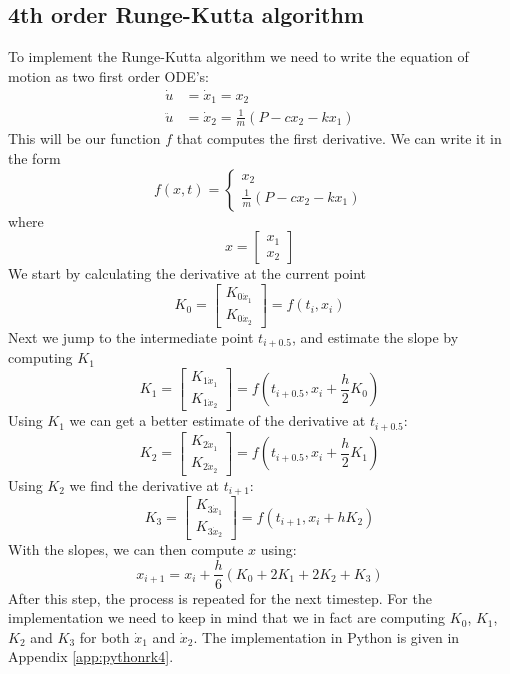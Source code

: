 \documentclass[11pt, a4paper, english, hidelinks]{NTNUoving}
\begin{document}
\subsection{4th order Runge-Kutta algorithm}
To implement the Runge-Kutta algorithm we need to write the equation of motion as two first order ODE's:
\begin{align}
	\label{eq:firstorderode}
	\dot{u} &= \dot{x}_1 = x_2 \\
	\ddot{u} &= \dot{x}_2 = \frac{1}{m}(P-cx_2-kx_1)
\end{align}
This will be our function $f$ that computes the first derivative. We can write it in the form
\begin{equation}
	f(x,t) = \begin{cases}
	x_2 \\
	\frac{1}{m}(P-cx_2-kx_1)
	\end{cases}
\end{equation}
where
$$
x = \begin{bmatrix}
x_1 \\ x_2
\end{bmatrix}
$$
We start by calculating the derivative at the current point
\begin{equation}
	\label{eq:k0}
	K_0 = \begin{bmatrix}
	K_{0\dot{x}_1} \\
	K_{0\dot{x}_2}
	\end{bmatrix} = f(t_i,x_i)
\end{equation}
Next we jump to the intermediate point $t_{i+0.5}$, and estimate the slope by computing $K_1$
\begin{equation}
	\label{eq:k1}
	K_1 = \begin{bmatrix}
	K_{1\dot{x}_1} \\
	K_{1\dot{x}_2}
	\end{bmatrix} = f(t_{i+0.5}, x_i + \frac{h}{2}K_0)
\end{equation}
Using $K_1$ we can get a better estimate of the derivative at $t_{i+0.5}$:
\begin{equation}
	\label{eq:k2}
	K_2 = \begin{bmatrix}
	K_{2\dot{x}_1} \\
	K_{2\dot{x}_2}
	\end{bmatrix} = f(t_{i+0.5}, x_i + \frac{h}{2}K_1)
\end{equation}
Using $K_2$ we find the derivative at $t_{i+1}$:
\begin{equation}
	\label{eq:k3}
	K_3 = \begin{bmatrix}
	K_{3\dot{x}_1} \\
	K_{3\dot{x}_2}
	\end{bmatrix} = f(t_{i+1},x_i+hK_2)
\end{equation}
With the slopes, we can then compute $x$ using:
\begin{equation}
	\label{eq:RK4weight}
	x_{i+1} = x_i + \frac{h}{6}(K_0 + 2K_1+2K_2+K_3)
\end{equation}
After this step, the process is repeated for the next timestep. 
For the implementation we need to keep in mind that we in fact are computing $K_0$, $K_1$, $K_2$ and $K_3$ for both $\dot{x}_1$ and $\dot{x}_2$. The implementation in Python is given in Appendix \ref{app:pythonrk4}.
\end{document}
